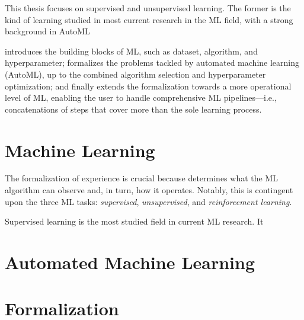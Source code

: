 \documentclass[a4paper,12pt,times,numbered,print,index]{Classes/PhDThesisPSnPDF}
\begin{document}
This thesis focuses on supervised and unsupervised learning.
The former is the kind of learning studied in most current research in the ML field, with a strong background in AutoML 



 introduces the building blocks of ML, such as dataset, algorithm, and hyperparameter;
 formalizes the problems tackled by automated machine learning (AutoML), up to the combined algorithm selection and hyperparameter optimization;
and finally  extends the formalization towards a more operational level of ML, enabling the user to handle comprehensive ML pipelines---i.e., concatenations of steps that cover more than the sole learning process.

\section{Machine Learning}\label{automl-background-sec:ml}






The formalization of experience is crucial because determines what the ML algorithm can observe and, in turn, how it operates.
Notably, this is contingent upon the three ML tasks: \textit{supervised}, \textit{unsupervised}, and \textit{reinforcement learning}.

Supervised learning is the most studied field in current ML research.
It 

\section{Automated Machine Learning}\label{automl-background-sec:automl}

\section{Formalization}\label{automl-background-sec:formalization}

\end{document}
